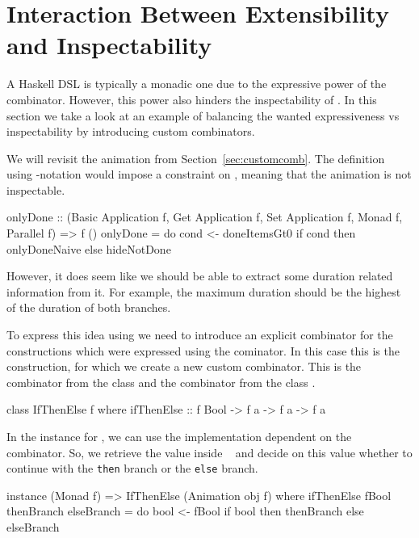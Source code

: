 \section{Interaction Between Extensibility and Inspectability}
\label{sec:interaction}

A Haskell DSL is typically a monadic one due to the expressive power of the \hs{>>=} combinator. However, this power also hinders the inspectability of \dsl{}. In this section we take a look at an example of balancing the wanted expressiveness vs inspectability by introducing custom combinators.

We will revisit the  animation from Section~\ref{sec:customcomb}. The definition using -notation would impose a  constraint on , meaning that the animation is not inspectable.

\begin{spec}
onlyDone :: (Basic Application f, Get Application f,
  Set Application f, Monad f, Parallel f) => f ()
onlyDone = do
  cond <- doneItemsGt0
  if cond then onlyDoneNaive else hideNotDone
\end{spec}

However, it does seem like we should be able to extract some duration related information from it. For example, the maximum duration should be the highest of the duration of both branches.

To express this idea using \dsl{} we need to introduce an explicit combinator for the constructions which were expressed using the \hs{>>=} cominator. In this case this is the  construction, for which we create a new custom combinator. This is the  combinator from the  class \cite{DBLP:phd/ethos/Yallop10} and the  combinator from the  class \cite{Mokhov:2019:SAF:3352468.3341694}.

\begin{code}
class IfThenElse f where
  ifThenElse :: f Bool -> f a -> f a -> f a
\end{code}

In the instance for , we can use the implementation dependent on the \hs{>>=} combinator. So, we retrieve the value inside ~ and decide on this value whether to continue with the \texttt{then} branch or the \texttt{else} branch.

\begin{code}
instance (Monad f) => IfThenElse (Animation obj f) where
  ifThenElse fBool thenBranch elseBranch = do
    bool <- fBool
    if bool then thenBranch else elseBranch
\end{code}

